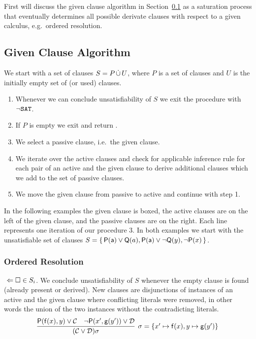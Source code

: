 First will discuss the given clause algorithm in Section~\ref{sec:given:clause:algorithm}
as a saturation process that eventually determines all possible derivate clauses
with respect to a given calculus, e.g.~ordered resolution.

\subsection{Given Clause Algorithm}\label{sec:given:clause:algorithm}

\begin{procedure}
	We start with a set of clauses \( S = P \mathop{\dot\cup} U \),
	where \( P \) is a set of  clauses
	and \( U \) is the initially empty set of  (or used) clauses.
	\begin{enumerate}
		\item[\jek] Whenever we can conclude unsatisfiability of \( S \)
		we exit the procedure with \( \lnot\texttt{SAT} \).
		\setcounter{enumi}{0}
		\item If \( P \) is empty we exit and return \SAT{}.
		\item We select a passive clause, i.e.~the given clause. \hfill\jek
		\item We iterate over the active clauses and check for applicable inference rule
		for each pair of an active and the given clause
		to derive additional clauses which we add to the set of passive clauses. \hfill\jek
		\item We move the given clause from passive to active and continue with step 1.
	\end{enumerate}
\end{procedure}


In the following examples the given clause is boxed,
the active clauses are on the left of the given clause,
and the passive clauses are on the right.
Each line represents one iteration of our procedure 3.
%
In both examples we start with the unsatisfiable set of clauses
\( S=\{ \, \mathsf{P}(\mathsf{a})\lor\mathsf{Q}(a), \mathsf{P}(\mathsf{a})\lor\lnot\mathsf{Q}(y), \lnot\mathsf{P}(x) \, \} \).

\subsubsection{Ordered Resolution}

\jek \( \ \Leftarrow\square\in S_i \). We conclude unsatisfiability of \( S \) whenever the empty clause is found (already present or derived).
New clauses are disjunctions of instances of an active and the given clause where conflicting literals were removed,
in other words the union of the two instances without the contradicting literals.
\begin{gather*}
\infer[\sigma=\{ x'\mapsto\mf(x), y\mapsto\mg(y') \}]{
	(\mcC \lor \mcD)\sigma
}{
	\mP(\mf(x), y) \lor \mcC & \lnot\mP(x',\mg(y')) \lor \mcD
}
\end{gather*}

